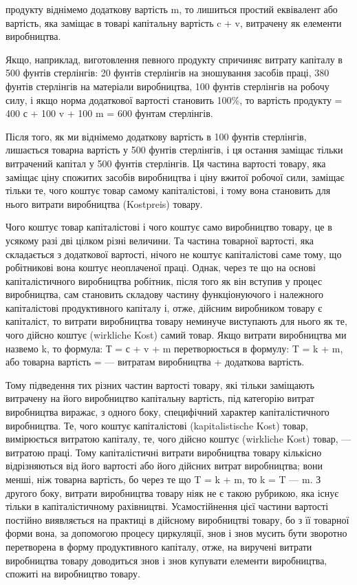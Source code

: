 \parcont{}  %
продукту віднімемо додаткову вартість m, то лишиться простий
еквівалент або вартість, яка заміщає в товарі капітальну вартість
c + v, витрачену як елементи виробництва.

Якщо, наприклад, виготовлення певного продукту спричиняє
витрату капіталу в 500 фунтів стерлінгів: 20 фунтів стерлінгів на
зношування засобів праці, 380 фунтів стерлінгів на матеріали
виробництва, 100 фунтів стерлінгів на робочу силу, і якщо норма
додаткової вартості становить 100\%, то вартість продукту =
400 с + 100 v + 100 m = 600 фунтам стерлінгів.

Після того, як ми віднімемо додаткову вартість в 100 фунтів
стерлінгів, лишається товарна вартість у 500 фунтів стерлінгів,
і ця остання заміщає тільки витрачений капітал у 500 фунтів
стерлінгів. Ця частина вартості товару, яка заміщає ціну спожитих
засобів виробництва і ціну вжитої робочої сили, заміщає
тільки те, чого коштує товар самому капіталістові, і тому вона
становить для нього витрати виробництва (Kostpreis) товару.

Чого коштує товар капіталістові і чого коштує само виробництво
товару, це в усякому разі дві цілком різні величини. Та
частина товарної вартості, яка складається з додаткової вартості,
нічого не коштує капіталістові саме тому, що робітникові
вона коштує неоплаченої праці. Однак, через те що на основі
капіталістичного виробництва робітник, після того як він вступив
у процес виробництва, сам становить складову частину
функціонуючого і належного капіталістові продуктивного капіталу
і, отже, дійсним виробником товару є капіталіст, то витрати
виробництва товару неминуче виступають для нього як
те, чого дійсно коштує (wirkliche Kost) самий товар. Якщо витрати
виробництва ми назвемо k, то формула: Т = с + v + m
перетворюється в формулу: T = k + m, або товарна вартість =
— витратам виробництва + додаткова вартість.

Тому підведення тих різних частин вартості товару, які тільки
заміщають витрачену на його виробництво капітальну вартість,
під категорію витрат виробництва виражає, з одного боку, специфічний
характер капіталістичного виробництва. Те, чого коштує
капіталістові (kapitalistische Kost) товар, вимірюється витратою
капіталу, те, чого дійсно коштує (wirkliche Kost) товар, —
витратою праці. Тому капіталістичні витрати виробництва товару
кількісно відрізняються від його вартості або його дійсних
витрат виробництва; вони менші, ніж товарна вартість, бо через
те що T = k + m, то k = T — m. З другого боку, витрати
виробництва товару ніяк не є такою рубрикою, яка існує тільки
в капіталістичному рахівництві. Усамостійнення цієї частини вартості
постійно виявляється на практиці в дійсному виробництві
товару, бо з її товарної форми вона, за допомогою процесу
циркуляції, знов і знов мусить бути зворотно перетворена
в форму продуктивного капіталу, отже, на виручені витрати виробництва
товару доводиться знов і знов купувати елементи
виробництва, спожиті на виробництво товару.
